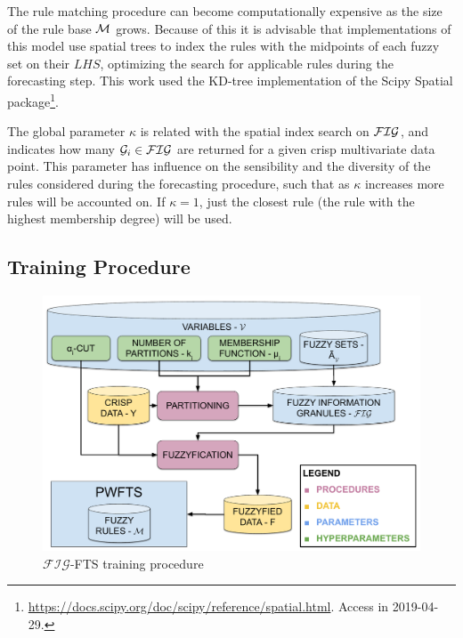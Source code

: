 The rule matching procedure can become computationally expensive as the size of the rule base $\mathcal{M}$ grows. Because of this it is advisable that implementations of this model use spatial trees  \cite{Muja2014} to index the rules with the midpoints of each fuzzy set on their $LHS$, optimizing the search for applicable rules during the forecasting step. This work used the KD-tree implementation of the Scipy Spatial package\footnote{\url{https://docs.scipy.org/doc/scipy/reference/spatial.html}. Access in 2019-04-29.}.

The global parameter $\kappa$ is related with the spatial index search on $\mathcal{FIG}$, and indicates how many $\mathcal{G}_i \in \mathcal{FIG}$ are returned for a given crisp multivariate data point. This parameter has influence on the sensibility and the diversity of the rules considered during the forecasting procedure, such that as $\kappa$ increases more rules will be accounted on. If $\kappa = 1$, just the closest rule (the rule with the highest membership degree) will be used. 

\subsection{Training Procedure}
\label{sec:fig_training_procedure}

\begin{figure}
\centering
\includegraphics[width=\textwidth]{figures/figfts_training_procedure.pdf}
\caption{$\mathcal{FIG}$-FTS training procedure} 
\label{fig:figfts_training_procedure}
\end{figure}

